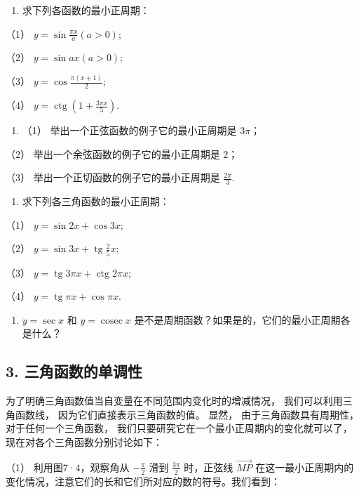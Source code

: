 \begin{enumerate}[start=3]
\item
  求下列各函数的最小正周期：
\end{enumerate}

（1） \(y = \sin \frac{\pi x}{a} (a > 0);\)

（2） \(y = \sin ax (a > 0);\)

（3） \(y = \cos \frac{\pi(x + 1)}{2};\)

（4） \(y = \operatorname{ctg}\left(1 + \frac{3\pi x}{5}\right).\)

\begin{enumerate}[start=4]
\item
  （1） 举出一个正弦函数的例子它的最小正周期是 \(3\pi\)；
\end{enumerate}

（2） 举出一个余弦函数的例子它的最小正周期是 2；

（3） 举出一个正切函数的例子它的最小正周期是 \(\frac{2\pi}{3}\).

\begin{enumerate}[start=5]
\item
  求下列各三角函数的最小正周期：
\end{enumerate}

（1） \(y = \sin 2x + \cos 3x;\)

（2） \(y = \sin 3x + \operatorname{tg} \frac{2}{5} x;\)

（3） \(y = \operatorname{tg} 3\pi x + \operatorname{ctg} 2\pi x;\)

（4） \(y = \operatorname{tg} \pi x + \cos \pi x.\)

\begin{enumerate}[start=6]
\item
  \(y = \sec x\) 和 \(y = \operatorname{cosec} x\)
  是不是周期函数？如果是的，它们的最小正周期各是什么？
\end{enumerate}

\subsection{3. 三角函数的单调性}

为了明确三角函数值当自变量在不同范围内变化时的增减情况，
我们可以利用三角函数线， 因为它们直接表示三角函数的值。 显然，
由于三角函数具有周期性， 对于任何一个三角函数，
我们只要研究它在一个最小正周期内的变化就可以了，现在对各个三角函数分别讨论如下：

（1） 利用图7·4，观察角从 \(-\frac{\pi}{2}\) 滑到 \(\frac{3\pi}{2}\)
时，正弦线 \(\overrightarrow{MP}\)
在这一最小正周期内的变化情况，注意它们的长和它们所对应的数的符号。我们看到：

